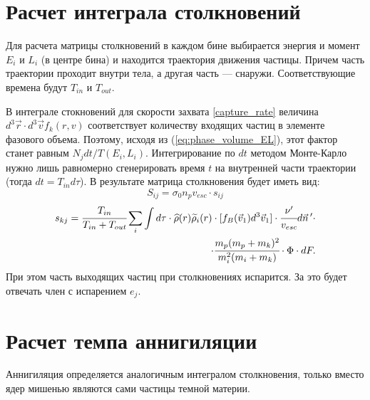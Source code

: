 \section{Расчет интеграла столкновений}
Для расчета матрицы столкновений в каждом бине выбирается энергия и момент $E_i$ и $L_i$ (в центре бина) и находится траектория движения частицы. Причем часть траектории проходит внутри тела, а другая часть --- снаружи. Соответствующие времена  будут $T_{in}$ и $T_{out}$. 

В интеграле стокновений для скорости захвата \ref{capture_rate} величина $d^{3}\vec{r} \cdot d^{3}\vec{v}f_{k}(r,v)$ соответствует количеству входящих частиц в элементе фазового объема. Поэтому, исходя из (\ref{eq:phase_volume_EL}), этот фактор станет равным $N_{j}dt/T(E_i,L_i)$. Интегрирование по $dt$ методом Монте-Карло нужно лишь равномерно сгенерировать время $t$ на внутренней части траектории (тогда $dt = T_{in} d\tau$). В результате матрица столкновения будет иметь вид:
\begin{equation}
	\label{matrix_simple}
	S_{ij} = \sigma_{0} n_p v_{esc} \cdot s_{ij}
\end{equation}
\begin{equation}
	\begin{split}
	\label{st_nd}
	s_{kj} = \cfrac{T_{in}}{T_{in}+T_{out}} \sum_i \int d\tau \cdot \widehat{\rho}(r) \widetilde{\rho}_i(r) 
		\cdot[f_{B}(\vec{v}_1) d^3\vec{v}_1] \cdot 
		\cfrac{\nu'}{v_{esc}} d\vec{n}\,' \cdot \\
		\cdot \cfrac{m_{p} (m_p+m_k)^2}{m_i^2 ( m_i + m_k)}
		\cdot \Phi \cdot dF.
	\end{split}
\end{equation}
При этом часть выходящих частиц при столкновениях испарится. За это будет отвечать член с испарением $e_j$.

\section{Расчет темпа аннигиляции}
Аннигиляция определяется аналогичным интегралом столкновения, только вместо ядер мишенью являются сами частицы темной материи. 

